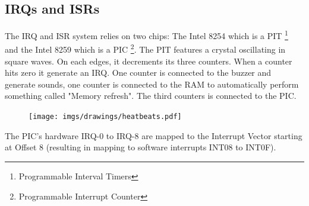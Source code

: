 \subsection{IRQs and ISRs}
The IRQ and ISR system relies on two chips: The Intel 8254 which is a PIT \footnote{Programmable Interval Timers} and the Intel 8259 which is a PIC \footnote{Programmable Interrupt Counter}. The PIT features a crystal oscillating in square waves. On each edges, it decrements its three counters. When a counter hits zero it generate an IRQ. One counter is connected to the buzzer and generate sounds, one counter is connected to the RAM to automatically perform something called "Memory refresh".  The third counters is connected to the PIC. 
\par
\begin{figure}[H]
\centering
 \texttt{[image: imgs/drawings/heatbeats.pdf]}
 \end{figure}
\par

The PIC's hardware IRQ-0 to IRQ-8 are mapped to the Interrupt Vector starting at Offset 8 (resulting in mapping to software interrupts INT08 to INT0F).\\

